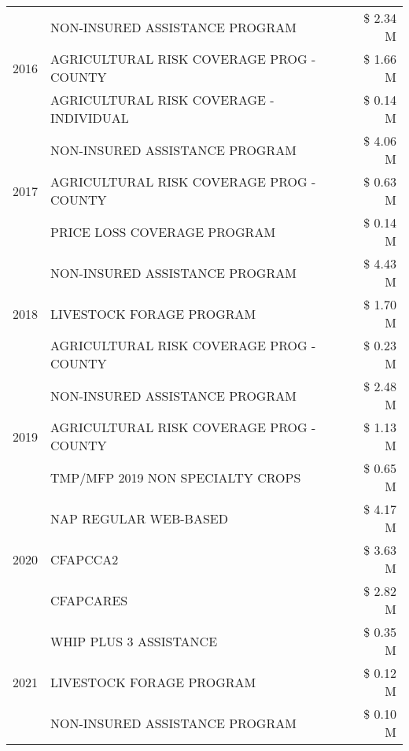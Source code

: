 \begin{tabular}{llr}
\cline{1-3}
\multirow[t]{3}{*}{2016} & NON-INSURED ASSISTANCE PROGRAM                & \$ 2.34 M \\
 & AGRICULTURAL RISK COVERAGE PROG - COUNTY      & \$ 1.66 M \\
 & AGRICULTURAL RISK COVERAGE - INDIVIDUAL       & \$ 0.14 M \\
\cline{1-3}
\multirow[t]{3}{*}{2017} & NON-INSURED ASSISTANCE PROGRAM & \$ 4.06 M \\
 & AGRICULTURAL RISK COVERAGE PROG - COUNTY & \$ 0.63 M \\
 & PRICE LOSS COVERAGE PROGRAM & \$ 0.14 M \\
\cline{1-3}
\multirow[t]{3}{*}{2018} & NON-INSURED ASSISTANCE PROGRAM & \$ 4.43 M \\
 & LIVESTOCK FORAGE PROGRAM & \$ 1.70 M \\
 & AGRICULTURAL RISK COVERAGE PROG - COUNTY & \$ 0.23 M \\
\cline{1-3}
\multirow[t]{3}{*}{2019} & NON-INSURED ASSISTANCE PROGRAM & \$ 2.48 M \\
 & AGRICULTURAL RISK COVERAGE PROG - COUNTY & \$ 1.13 M \\
 & TMP/MFP 2019 NON SPECIALTY CROPS & \$ 0.65 M \\
\cline{1-3}
\multirow[t]{3}{*}{2020} & NAP REGULAR WEB-BASED & \$ 4.17 M \\
 & CFAPCCA2 & \$ 3.63 M \\
 & CFAPCARES & \$ 2.82 M \\
\cline{1-3}
\multirow[t]{3}{*}{2021} & WHIP PLUS 3 ASSISTANCE & \$ 0.35 M \\
 & LIVESTOCK FORAGE PROGRAM & \$ 0.12 M \\
 & NON-INSURED ASSISTANCE PROGRAM & \$ 0.10 M \\
\cline{1-3}
\bottomrule
\end{tabular}
